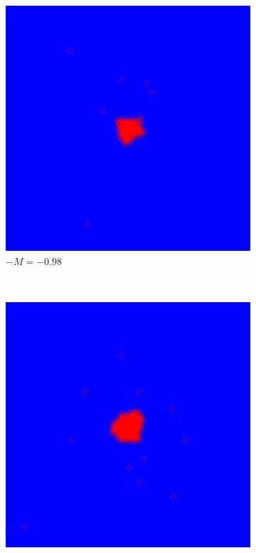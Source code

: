 \documentclass[a4paper,12pt]{article}
\theoremstyle{plain}
\theoremstyle{definition}
\begin{document}
      \begin{figure}[H]
         \centering
          \begin{subfigure}[t]{0.3\textwidth}
            \includegraphics[width=\textwidth]{398c.png}
              \caption*{$-M=-0.98$}
          \end{subfigure}
          ~
          \begin{subfigure}[t]{0.3\textwidth}
            \includegraphics[width=\textwidth]{397c.png}

\end{subfigure}
\end{figure}
\end{document}

